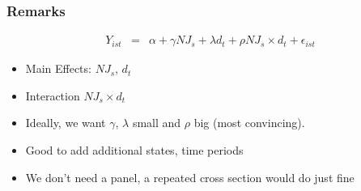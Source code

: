 \documentclass[notes=show,beamer,compress]{beamer}
\begin{document}




\begin{frame}
\frametitle{Remarks}

 \begin{eqnarray*}
Y_{ist}&=& \alpha + \gamma NJ_{s}+ \lambda d_{t}+ \rho NJ_{s}\times d_{t}+ \epsilon_{ist}
 \end{eqnarray*}

\begin {itemize}
\item Main Effects: $NJ_{s}$,  $d_{t}$
\item Interaction $NJ_{s} \times d_{t}$
\item Ideally, we want $\gamma$, $\lambda$ small and $\rho$ big (most convincing).
\item Good to add additional states, time periods
\item{We don't need a panel, a repeated cross section would do just fine}
\end {itemize}
\end{frame}
\end{document}
